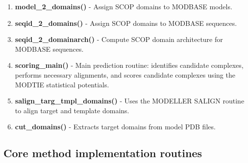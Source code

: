 \documentclass[11pt]{article}
\begin{document}
\begin{enumerate}
\item {\bf model\_2\_domains()} - Assign SCOP domains to MODBASE models.

\item {\bf seqid\_2\_domains()} - Assign SCOP domains to MODBASE sequences.

\item {\bf seqid\_2\_domainarch()} - Compute SCOP domain architecture for MODBASE sequences.

\item {\bf scoring\_main()} - Main prediction routine: identifies candidate complexes, performs necessary alignments, and scores candidate complexes using the MODTIE statistical potentials.

\item {\bf salign\_targ\_tmpl\_domains()} - Uses the MODELLER SALIGN routine to align target and template domains.

\item {\bf cut\_domains()} - Extracts target domains from model PDB files.
\end{enumerate}

\subsection{Core method implementation routines}
\end{document}
